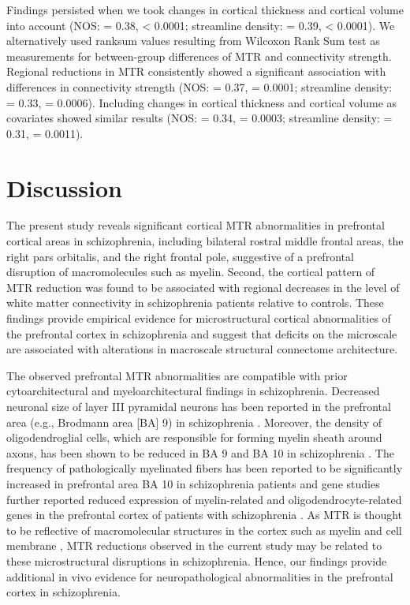 \begin{refsection}
Findings persisted when we took changes in cortical thickness and cortical volume into account (NOS: \rval = 0.38, \pval < 0.0001; streamline density: \rval = 0.39, \pval < 0.0001). We alternatively used ranksum values resulting from Wilcoxon Rank Sum test as measurements for between-group differences of MTR and connectivity strength. Regional reductions in MTR consistently showed a significant association with differences in connectivity strength (NOS: \rval = 0.37, \pval = 0.0001; streamline density: \rval = 0.33, \pval = 0.0006). Including changes in cortical thickness and cortical volume as covariates showed similar results (NOS: \rval = 0.34, \pval = 0.0003; streamline density: \rval = 0.31, \pval = 0.0011).


\section*{Discussion}
The present study reveals significant cortical MTR abnormalities in prefrontal cortical areas in schizophrenia, including bilateral rostral middle frontal areas, the right pars orbitalis, and the right frontal pole, suggestive of a prefrontal disruption of macromolecules such as myelin. Second, the cortical pattern of MTR reduction was found to be associated with regional decreases in the level of white matter connectivity in schizophrenia patients relative to controls. These findings provide empirical evidence for microstructural cortical abnormalities of the prefrontal cortex in schizophrenia and suggest that deficits on the microscale are associated with alterations in macroscale structural connectome architecture.

The observed prefrontal MTR abnormalities are compatible with prior cytoarchitectural and myeloarchitectural findings in schizophrenia. Decreased neuronal size of layer III pyramidal neurons has been reported in the prefrontal area (e.g., Brodmann area [BA] 9) in schizophrenia \citep{Pierri2001DecreasedSS,Rajkowska1998NeuronalAG}. Moreover, the density of oligodendroglial cells, which are responsible for forming myelin sheath around axons, has been shown to be reduced in BA 9 and BA 10 in schizophrenia \citep{Hof2003LossAA,Uranova2001ElectronMO,Uranova2004OligodendroglialDI}. The frequency of pathologically myelinated fibers has been reported to be significantly increased in prefrontal area BA 10 in schizophrenia patients \citep{Uranova2011UltrastructuralAO} and gene studies further reported reduced expression of myelin-related and oligodendrocyte-related genes in the prefrontal cortex of patients with schizophrenia \citep{Pierri2001DecreasedSS,Mimmack2002GeneEA,Pongrac2002GeneEP}. As MTR is thought to be reflective of macromolecular structures in the cortex such as myelin and cell membrane \citep{wolff1994magnetization}, MTR reductions observed in the current study may be related to these microstructural disruptions in schizophrenia. Hence, our findings provide additional in vivo evidence for neuropathological abnormalities in the prefrontal cortex in schizophrenia. 


\end{refsection}
